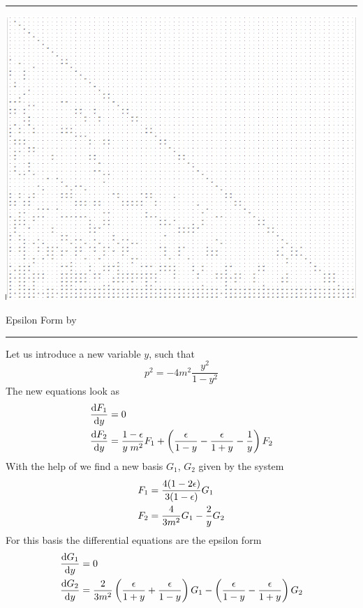 \documentclass[11pt]{article}
\newcommand{\titleb}[2]{{\color{Blue}{\LARGE #1}\hfill{\Large #2}\vspace{-2mm}\par\rule{\textwidth}{1pt}\vs}}
\newcommand{\titlea}[1]{\titleb{#1}{}}
\begin{document}
\titlea{II. A few words on \fuchsia}
\centerline{ \includegraphics[width=0.8\pagewidth]{img/matrix.png} }
\newpage


\titleb{Example 1}{Epsilon Form by \fuchsia}
Let us introduce a new variable $y$, such that
$$p^2 = -4m^2\frac{y^2}{1-y^2}$$%
The new equations look as
  $$
    \begin{aligned}
     \frac{\mathrm{d} F_1}{\mathrm{d} y} & = 0
     \\
     \frac{\mathrm{d} F_2}{\mathrm{d} y} & = \frac{1-\epsilon}{y \; m^2} F_1 + \left( \frac{\epsilon}{1-y} - \frac{\epsilon}{1+y} - \frac{1}{y} \right) F_2
    \end{aligned}
  $$%
With the help of \fuchsia we find a new basis $G_1$, $G_2$ given by the system
  $$
    \begin{aligned}
     F_1 & = \frac{4(1-2\epsilon)}{3(1-\epsilon)} G_1
     \\
     F_2 & = \frac{4}{3m^2} G_1 - \frac{2}{y} G_2
    \end{aligned}
  $$%
For this basis the differential equations are the epsilon form
  $$
    \begin{aligned}
     \frac{\mathrm{d} G_1}{\mathrm{d} y} & = 0
     \\
     \frac{\mathrm{d} G_2}{\mathrm{d} y} & = \frac{2}{3m^2}\left( \frac{\epsilon}{1+y}+\frac{\epsilon}{1-y} \right) G_1 - \left(\frac{\epsilon}{1-y}-\frac{\epsilon}{1+y}\right) G_2
    \end{aligned}
  $$
\newpage
\end{document}
